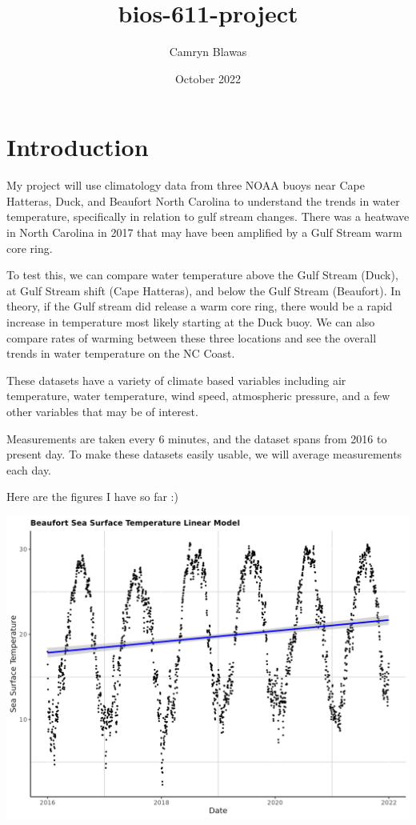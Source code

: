 \documentclass{article}
\title{bios-611-project}
\author{Camryn Blawas}
\date{October 2022}
\begin{document}
\maketitle

\section{Introduction}
My project will use climatology data from three NOAA buoys near Cape Hatteras, Duck, and Beaufort North Carolina to understand the trends in water temperature, specifically in relation to gulf stream changes. There was a heatwave in North Carolina in 2017 that may have been amplified by a Gulf Stream warm core ring.

To test this, we can compare water temperature above the Gulf Stream (Duck), at Gulf Stream shift (Cape Hatteras), and below the Gulf Stream (Beaufort). In theory, if the Gulf stream did release a warm core ring, there would be a rapid increase in temperature most likely starting at the Duck buoy. We can also compare rates of warming between these three locations and see the overall trends in water temperature on the NC Coast.

These datasets have a variety of climate based variables including air temperature, water temperature, wind speed, atmospheric pressure, and a few other variables that may be of interest.

Measurements are taken every 6 minutes, and the dataset spans from 2016 to present day. To make these datasets easily usable, we will average measurements each day.

Here are the figures I have so far :)

\includegraphics[scale=0.5]{beaufsstglm}
\end{document}
